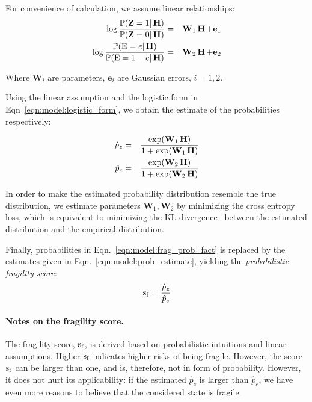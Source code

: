 For convenience of calculation, we assume linear relationships: 
\begin{eqnarray}
   \log\frac{\mathbb P(\mathbf{Z}=1|\operatorname*{\mathbf{H}})}{\mathbb P(\mathbf{Z}=0|\operatorname*{\mathbf{H}})} & = & \mathbf{W}_1\operatorname*{\mathbf{H}} + \mathbf{e}_1 \nonumber \\
   \log\frac{\mathbb P(\mathbf{\operatorname*{E}}=e|\operatorname*{\mathbf{H}})}{\mathbb P(\mathbf{\operatorname*{E}}=1-e|\operatorname*{\mathbf{H}})} & = & \mathbf{W}_2\operatorname*{\mathbf{H}} + \mathbf{e}_2 
   \label{eqn:model:logistic_form}
\end{eqnarray}

Where $\mathbf{W}_i$ are parameters, $\mathbf{e}_i$ are Gaussian errors, $i=1,2$.

Using the linear assumption and the logistic form in Eqn~\ref{eqn:model:logistic_form}, we obtain the estimate of the probabilities respectively:

\begin{eqnarray}
   \hat{p}_z & = & \frac{\exp(\mathbf{W}_1\operatorname*{\mathbf{H}})}{1+\exp(\mathbf{W}_1\operatorname*{\mathbf{H}})} \nonumber \\
   \hat{p}_e & = & \frac{\exp(\mathbf{W}_2\operatorname*{\mathbf{H}})}{1+\exp(\mathbf{W}_2\operatorname*{\mathbf{H}})}
   \label{eqn:model:prob_estimate}
\end{eqnarray}

In order to make the estimated probability distribution resemble the true distribution, we estimate parameters $\mathbf{W}_1, \mathbf{W}_2$ by minimizing the cross entropy loss, which is equivalent to minimizing the KL divergence~ between the estimated distribution and the empirical distribution. 

Finally, probabilities in Eqn.~\ref{eqn:model:frag_prob_fact} is replaced by the estimates given in Eqn.~\ref{eqn:model:prob_estimate}, yielding the \emph{probabilistic fragility score}:
\begin{equation}
  \label{eqn:model:frag_score}  
  \operatorname*{s_f} = \frac{\hat{p}_z}{\hat{p}_e}
\end{equation}

\paragraph{Notes on the fragility score.} The fragility score, $\operatorname*{s_f}$, is derived based on probabilistic intuitions and linear assumptions. Higher $\operatorname*{s_f}$ indicates higher risks of being fragile. However, the score $\operatorname*{s_f}$ can be larger than one, and is, therefore, not in form of probability. However, it does not hurt its applicability: if the estimated $\hat{p}_z$ is larger than $\hat{p}_e$, we have even more reasons to believe that the considered state is fragile. 


